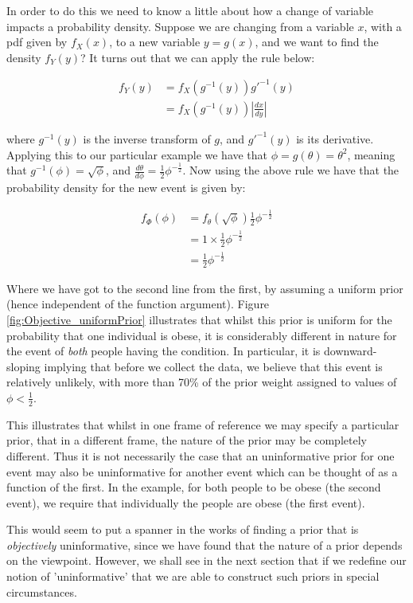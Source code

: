 \documentclass[11pt,fullpage]{book}
\begin{document}
In order to do this we need to know a little about how a change of variable impacts a probability density. Suppose we are changing from a variable $x$, with a pdf given by $f_X(x)$, to a new variable $y=g(x)$, and we want to find the density $f_Y(y)$? It turns out that we can apply the rule below:

\begin{align}\label{eq:Objective_jacobianTransform}
f_Y(y) &= f_X(g^{-1}(y)) g'^{-1}(y)\\
&= f_X(g^{-1}(y)) |\frac{dx}{dy}|
\end{align}

where $g^{-1}(y)$ is the inverse transform of $g$, and $g'^{-1}(y)$ is its derivative. Applying this to our particular example we have that $\phi=g(\theta) = \theta^2$, meaning that $g^{-1}(\phi) = \sqrt{\phi}$, and $\frac{d\theta}{d\phi}= \frac{1}{2}\phi^{-\frac{1}{2}}$. Now using the above rule we have that the probability density for the new event is given by:

\begin{align}
f_\Phi(\phi) &= f_\theta(\sqrt{\phi}) \frac{1}{2}\phi^{-\frac{1}{2}}\\
&= 1 \times \frac{1}{2}\phi^{-\frac{1}{2}}\\
&= \frac{1}{2}\phi^{-\frac{1}{2}}
\end{align}

Where we have got to the second line from the first, by assuming a uniform prior (hence independent of the function argument). Figure \ref{fig:Objective_uniformPrior} illustrates that whilst this prior is uniform for the probability that one individual is obese, it is considerably different in nature for the event of \textit{both} people having the condition. In particular, it is downward-sloping implying that before we collect the data, we believe that this event is relatively unlikely, with more than 70\% of the prior weight assigned to values of $\phi<\frac{1}{2}$.

This illustrates that whilst in one frame of reference we may specify a particular prior, that in a different frame, the nature of the prior may be completely different. Thus it is not necessarily the case that an uninformative prior for one event may also be uninformative for another event which can be thought of as a function of the first. In the example, for both people to be obese (the second event), we require that individually the people are obese (the first event).

This would seem to put a spanner in the works of finding a prior that is \textit{objectively} uninformative, since we have found that the nature of a prior depends on the viewpoint.  However, we shall see in the next section that if we redefine our notion of 'uninformative' that we are able to construct such priors in special circumstances. 
\end{document}
